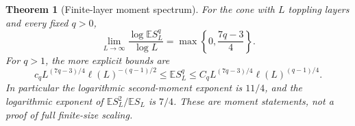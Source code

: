 \documentclass[11pt]{article}
\numberwithin{equation}{section}
\newtheorem{theorem}{Theorem}[section]
\theoremstyle{definition}
\newcommand{\E}{\mathbb E}
\begin{document}
\begin{theorem}[Finite-layer moment spectrum]\label{thm:size-moment-spectrum}
For the cone with $L$ toppling layers and every fixed $q>0$,
\begin{equation}\label{eq:size-moment-spectrum}
 \lim_{L\to\infty}\frac{\log\E S_L^q}{\log L}
 =\max\left\{0,\frac{7q-3}{4}\right\}.
\end{equation}
For $q>1$, the more explicit bounds are
\begin{equation}\label{eq:high-size-moments}
 c_q L^{(7q-3)/4}\ell(L)^{-(q-1)/2}
 \le\E S_L^q
 \le C_q L^{(7q-3)/4}\ell(L)^{(q-1)/4}.
\end{equation}
In particular the logarithmic second-moment exponent is $11/4$, and the logarithmic exponent of $\E S_L^2/\E S_L$ is $7/4$. These are moment statements, not a proof of full finite-size scaling.
\end{theorem}
\end{document}

